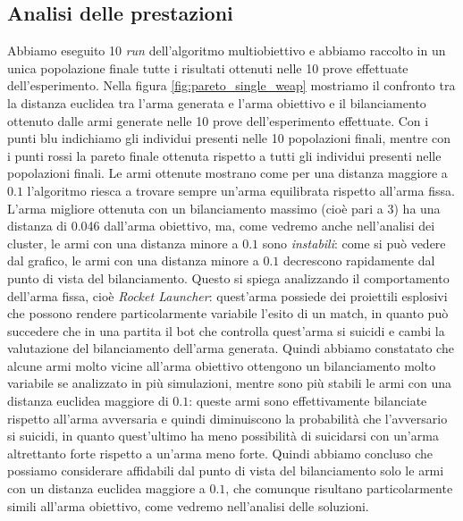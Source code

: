 \documentclass[12pt, italian]{toptesi}
\begin{document}
\subsection{Analisi delle prestazioni}
Abbiamo eseguito 10 \emph{run} dell'algoritmo multiobiettivo e abbiamo raccolto in un unica popolazione finale tutte i risultati ottenuti nelle 10 prove effettuate dell'esperimento.
Nella figura \ref{fig:pareto_single_weap} mostriamo il confronto tra la distanza euclidea tra l'arma generata e l'arma obiettivo e il bilanciamento ottenuto dalle armi generate nelle 10 prove dell'esperimento effettuate.
Con i punti blu indichiamo gli individui presenti nelle 10 popolazioni finali, mentre con i punti rossi la pareto finale ottenuta rispetto a tutti gli individui presenti nelle popolazioni finali.
Le armi ottenute mostrano come per una distanza maggiore a $0.1$ l'algoritmo riesca a trovare sempre un'arma equilibrata rispetto all'arma fissa. 
L'arma migliore ottenuta con un bilanciamento massimo (cioè pari a 3) ha una distanza di 0.046 dall'arma obiettivo, ma, come vedremo anche nell'analisi dei cluster, le armi con una distanza minore a $0.1$ sono \emph{instabili}: come si può vedere dal grafico, le armi con una distanza minore a $0.1$ decrescono rapidamente dal punto di vista del bilanciamento.
Questo si spiega analizzando il comportamento dell'arma fissa, cioè \emph{Rocket Launcher}: quest'arma possiede dei proiettili esplosivi che possono rendere particolarmente variabile l'esito di un match, in quanto può succedere che in una partita il bot che controlla quest'arma si suicidi e cambi la valutazione del bilanciamento dell'arma generata. Quindi abbiamo constatato che alcune armi molto vicine all'arma obiettivo ottengono un bilanciamento molto variabile se analizzato in più simulazioni, mentre sono più stabili le armi con una distanza euclidea maggiore di $0.1$: queste armi sono effettivamente bilanciate rispetto all'arma avversaria e quindi diminuiscono la probabilità che l'avversario si suicidi, in quanto quest'ultimo ha meno possibilità di suicidarsi con un'arma altrettanto forte rispetto a un'arma meno forte.
Quindi abbiamo concluso che possiamo considerare affidabili dal punto di vista del bilanciamento solo le armi con un distanza euclidea maggiore a $0.1$, che comunque risultano particolarmente simili all'arma obiettivo, come vedremo nell'analisi delle soluzioni.
\end{document}

